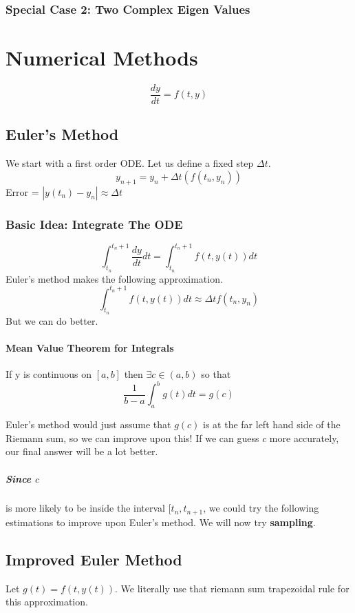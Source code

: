\documentclass[a4paper,12pt]{report}
\begin{document}
\subsection{Special Case 2: Two Complex Eigen Values}

\chapter{Numerical Methods}
$$\frac{dy}{dt} = f(t, y)$$
\section{Euler's Method}
We start with a first order ODE. Let us define a fixed step $\Delta t$.
$$y_{n+1} = y_n + \Delta t(f(t_n, y_n))$$
Error = $|y(t_n)-y_n| \approx \Delta t$

\subsection{Basic Idea: Integrate The ODE}
$$\int_{t_n}^{t_n+1} \frac{dy}{dt} dt = \int_{t_n}^{t_n+1} f(t, y(t)) dt$$
Euler's method makes the following approximation.
$$\int_{t_n}^{t_n+1} f(t, y(t)) dt \approx \Delta t f(t_n, y_n)$$
But we can do better.

\subsubsection{Mean Value Theorem for Integrals}
If y is continuous on $[a, b]$ then $\exists c \in (a, b)$ so that 
$$\frac{1}{b-a} \int_a^b g(t) dt = g(c)$$
 
Euler's method would just assume that $g(c)$ is at the far left hand side of the 
Riemann sum, so we can improve upon this! If we can guess $c$ more accurately, 
our final answer will be a lot better.

\paragraph{Since $c$} is more likely to be inside the interval $[t_n, t_{n+1}$, we could 
try the following estimations to improve upon Euler's method. We will now try \textbf{sampling}.

\section{Improved Euler Method}
Let $g(t) = f(t, y(t))$. We literally use that riemann sum trapezoidal rule for this approximation.
\end{document}

